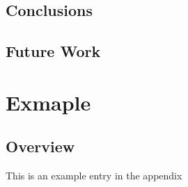 \documentclass[a4paper,twoside,phd]{BYUPhys}
\begin{document}
\section{Conclusions}
\label{sec:ConclusionsConclusions}

\section{Future Work}
\label{FutureWork}



\clearemptydoublepage


\appendix
\chapter{Exmaple}
\section{Overview}
This is an example entry in the appendix



%

%

%
\end{document}

